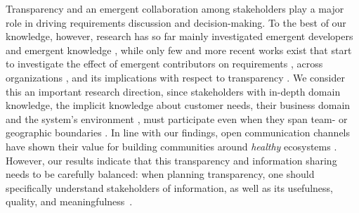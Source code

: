 

Transparency and an emergent collaboration among stakeholders play a major role in driving requirements discussion and decision-making.
To the best of our knowledge, however, research has so far mainly investigated emergent developers~\cite{Minto2007,Haenni2014,Sadi2015} and emergent knowledge \cite{Treude2012}, while only few and more recent works exist that start to investigate the effect of emergent contributors on requirements \cite{Kwan2011}, across organizations \cite{Linaker2016,KYB+2016}, and its implications with respect to transparency \cite{Dabbish2013,Hosseini2016}. 
We consider this an important research direction, since stakeholders with in-depth domain knowledge, the implicit knowledge about customer needs, their business domain and the system's environment \cite{Damian2013}, must participate even when they span team- or geographic boundaries \cite{boden2009bridging}.
In line with our findings, open communication channels have shown their value for building communities around {\it healthy} ecosystems  \cite{Kilamo2012}. 
However, our results indicate that this transparency and information sharing needs to be carefully balanced: when planning transparency, one should specifically understand %
stakeholders of information, 
as well as its usefulness, quality, and meaningfulness~\cite{Hosseini2016}.
